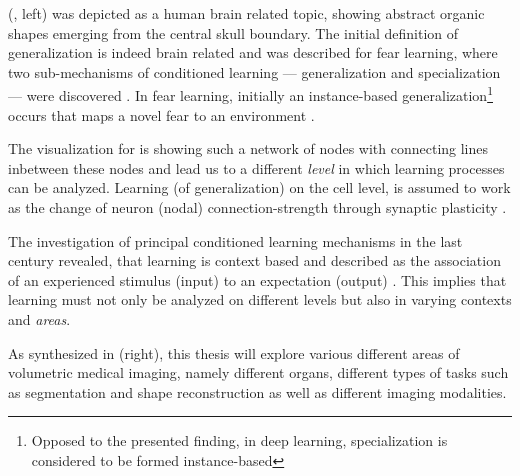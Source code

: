      (, left) was depicted as a human brain related topic, showing abstract organic shapes emerging from the central skull boundary.
    The initial definition of generalization is indeed brain related and was described for fear learning, where two sub-mechanisms of conditioned learning --- generalization and specialization --- were discovered \citep{banich2011generalization}. %
    In fear learning, initially an instance-based generalization\footnote{Opposed to the presented finding, in deep learning, specialization is considered to be formed instance-based} occurs that maps a novel fear to an environment \citep{banich2011generalization}.

    The visualization for  is showing such a network of nodes with connecting lines inbetween these nodes and lead us to a different \emph{level} in which learning processes can be analyzed.
    Learning (of generalization) on the cell level, is assumed to work as the change of neuron (nodal) connection-strength through synaptic plasticity \citep{do1949organization, martin2000synaptic}.

    The investigation of principal conditioned learning mechanisms in the last century revealed, that learning is context based and described as the association of an experienced stimulus (input) to an expectation (output)
    \citep{pavlov1928conditioned, pavlov2010conditioned, banich2011generalization}. This implies that learning must not only be analyzed on different levels but also in varying contexts and \emph{areas}.

    As synthesized in  (right),
    this thesis will explore various different areas of volumetric medical imaging, namely different organs, different types of tasks such as segmentation and shape reconstruction as well as different imaging modalities.


